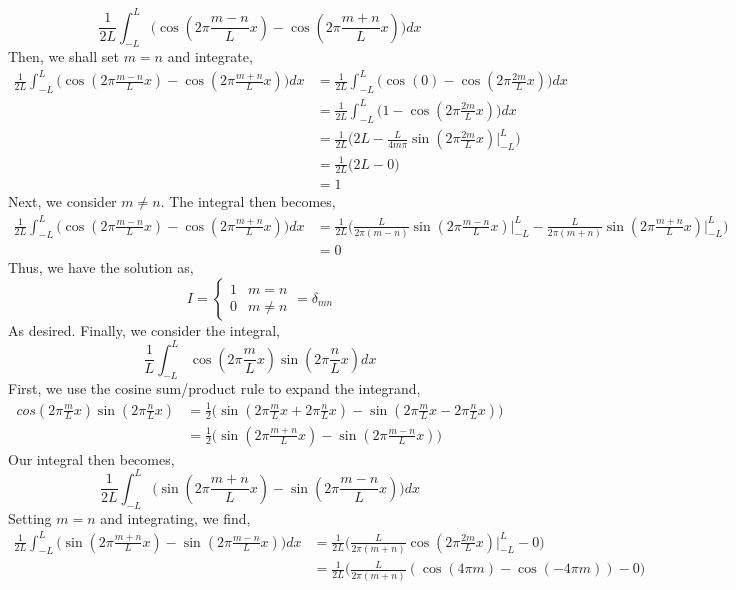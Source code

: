 \documentclass[letterpaper,10pt]{article}
\begin{document}
\begin{enumerate}
\[\frac{1}{2L}\int_{-L}^L\bigg(\cos(2\pi \frac{m-n}{L} x)-\cos(2\pi \frac{m+n}{L} x)\bigg)dx\]
Then, we shall set $m=n$ and integrate,
\begin{align*}
\frac{1}{2L}\int_{-L}^L\bigg(\cos(2\pi \frac{m-n}{L} x)-\cos(2\pi \frac{m+n}{L} x)\bigg)dx &= \frac{1}{2L}\int_{-L}^L\bigg(\cos(0)-\cos(2\pi \frac{2m}{L} x)\bigg)dx\\
&=\frac{1}{2L}\int_{-L}^L\bigg(1-\cos(2\pi \frac{2m}{L} x)\bigg)dx\\
&=\frac{1}{2L}\bigg(2L-\frac{L}{4m\pi}\sin(2\pi \frac{2m}{L} x)\bigg|_{-L}^L\bigg) \\
&=\frac{1}{2L}\bigg(2L-0\bigg)\\
&=1
\end{align*}
Next, we consider $m\neq n$. The integral then becomes,
\begin{align*}
\frac{1}{2L}\int_{-L}^L\bigg(\cos(2\pi \frac{m-n}{L} x)-\cos(2\pi \frac{m+n}{L} x)\bigg)dx &= \frac{1}{2L}\bigg(\frac{L}{2\pi (m-n)}\sin(2\pi \frac{m-n}{L} x)\bigg|_{-L}^L-\frac{L}{2\pi (m+n)}\sin(2\pi \frac{m+n}{L} x)\bigg|_{-L}^L\bigg)\\
&=0
\end{align*}
Thus, we have the solution as,
\[I=\begin{cases}
1 & m=n \\
0 & m\neq n
\end{cases}=\delta_{mn}\]
As desired. Finally, we consider the integral,
\begin{equation}
\frac{1}{L}\int_{-L}^{L}\cos(2\pi \frac{m}{L}x)\sin(2\pi\frac{n}{L}x)dx
\end{equation}
First, we use the cosine sum/product rule to expand the integrand,
\begin{align*}
cos(2\pi \frac{m}{L}x)\sin(2\pi\frac{n}{L}x) &= \frac{1}{2}\bigg(\sin(2\pi \frac{m}{L}x+2\pi\frac{n}{L}x)-\sin(2\pi \frac{m}{L}x-2\pi\frac{n}{L}x)\bigg)\\
&= \frac{1}{2}\bigg(\sin(2\pi \frac{m+n}{L}x)-\sin(2\pi \frac{m-n}{L}x)\bigg)
\end{align*}
Our integral then becomes,
\[\frac{1}{2L}\int_{-L}^{L}\bigg(\sin(2\pi \frac{m+n}{L}x)-\sin(2\pi \frac{m-n}{L}x)\bigg)dx\]
Setting $m=n$ and integrating, we find,
\begin{align*}
\frac{1}{2L}\int_{-L}^{L}\bigg(\sin(2\pi \frac{m+n}{L}x)-\sin(2\pi \frac{m-n}{L}x)\bigg)dx &= \frac{1}{2L}\bigg(\frac{L}{2\pi (m+n)}\cos(2\pi \frac{2m}{L}x)\bigg|_{-L}^L-0\bigg)\\
&= \frac{1}{2L}\bigg(\frac{L}{2\pi (m+n)}(\cos(4\pi m)-\cos(-4\pi m))-0\bigg)\\

\end{align*}
\end{enumerate}
\end{document}
